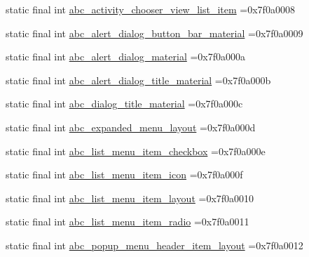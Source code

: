 \begin{DoxyCompactItemize}
\item 
static final int \mbox{\hyperlink{classbr_1_1unb_1_1cic_1_1mp_1_1marketmaster_1_1test_1_1R_1_1layout_aed5cf23761c83a143d74b21419c89e2b}{abc\+\_\+activity\+\_\+chooser\+\_\+view\+\_\+list\+\_\+item}} =0x7f0a0008
\item 
static final int \mbox{\hyperlink{classbr_1_1unb_1_1cic_1_1mp_1_1marketmaster_1_1test_1_1R_1_1layout_a8b2a6eb87654827ad2f0ef3b72160056}{abc\+\_\+alert\+\_\+dialog\+\_\+button\+\_\+bar\+\_\+material}} =0x7f0a0009
\item 
static final int \mbox{\hyperlink{classbr_1_1unb_1_1cic_1_1mp_1_1marketmaster_1_1test_1_1R_1_1layout_aeca99d96ba0906685a50ad5834a165c7}{abc\+\_\+alert\+\_\+dialog\+\_\+material}} =0x7f0a000a
\item 
static final int \mbox{\hyperlink{classbr_1_1unb_1_1cic_1_1mp_1_1marketmaster_1_1test_1_1R_1_1layout_ae1ec38dbb63b1ca6c8d09d73d715a358}{abc\+\_\+alert\+\_\+dialog\+\_\+title\+\_\+material}} =0x7f0a000b
\item 
static final int \mbox{\hyperlink{classbr_1_1unb_1_1cic_1_1mp_1_1marketmaster_1_1test_1_1R_1_1layout_a41511815aca2e8e0329bce556b71a740}{abc\+\_\+dialog\+\_\+title\+\_\+material}} =0x7f0a000c
\item 
static final int \mbox{\hyperlink{classbr_1_1unb_1_1cic_1_1mp_1_1marketmaster_1_1test_1_1R_1_1layout_a43948ae26fec3c728c96b55b71e6f6ca}{abc\+\_\+expanded\+\_\+menu\+\_\+layout}} =0x7f0a000d
\item 
static final int \mbox{\hyperlink{classbr_1_1unb_1_1cic_1_1mp_1_1marketmaster_1_1test_1_1R_1_1layout_abefd9a037a2cf8bfe3607cb1c0762d43}{abc\+\_\+list\+\_\+menu\+\_\+item\+\_\+checkbox}} =0x7f0a000e
\item 
static final int \mbox{\hyperlink{classbr_1_1unb_1_1cic_1_1mp_1_1marketmaster_1_1test_1_1R_1_1layout_aa4b0afa566d24441ca03cb8fe62631bc}{abc\+\_\+list\+\_\+menu\+\_\+item\+\_\+icon}} =0x7f0a000f
\item 
static final int \mbox{\hyperlink{classbr_1_1unb_1_1cic_1_1mp_1_1marketmaster_1_1test_1_1R_1_1layout_a5cdbb7ca194b1417ef3060eb006cdb6f}{abc\+\_\+list\+\_\+menu\+\_\+item\+\_\+layout}} =0x7f0a0010
\item 
static final int \mbox{\hyperlink{classbr_1_1unb_1_1cic_1_1mp_1_1marketmaster_1_1test_1_1R_1_1layout_aec2472b567307b666aa89d7b4fa8b805}{abc\+\_\+list\+\_\+menu\+\_\+item\+\_\+radio}} =0x7f0a0011
\item 
static final int \mbox{\hyperlink{classbr_1_1unb_1_1cic_1_1mp_1_1marketmaster_1_1test_1_1R_1_1layout_ad074444786b6f7f93320871f4c9a5971}{abc\+\_\+popup\+\_\+menu\+\_\+header\+\_\+item\+\_\+layout}} =0x7f0a0012

\end{DoxyCompactItemize}
